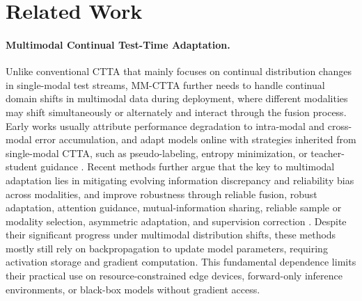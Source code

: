 \section{Related Work}

\paragraph{Multimodal Continual Test-Time Adaptation.}
Unlike conventional CTTA that mainly focuses on continual distribution changes in single-modal test streams, MM-CTTA further needs to handle continual domain shifts in multimodal data during deployment, where different modalities may shift simultaneously or alternately and interact through the fusion process.
Early works usually attribute performance degradation to intra-modal and cross-modal error accumulation, and adapt models online with strategies inherited from single-modal CTTA, such as pseudo-labeling, entropy minimization, or teacher-student guidance \citep{wang2021tent,niu2022eata,niu2023sar,wang2022continualtta}.
Recent methods further argue that the key to multimodal adaptation lies in mitigating evolving information discrepancy and reliability bias across modalities, and improve robustness through reliable fusion, robust adaptation, attention guidance, mutual-information sharing, reliable sample or modality selection, asymmetric adaptation, and supervision correction \citep{guo2025smoothing,yang2024read,chen2025tsa,he2026dasp}.
Despite their significant progress under multimodal distribution shifts, these methods mostly still rely on backpropagation to update model parameters, requiring activation storage and gradient computation.
This fundamental dependence limits their practical use on resource-constrained edge devices, forward-only inference environments, or black-box models without gradient access.

